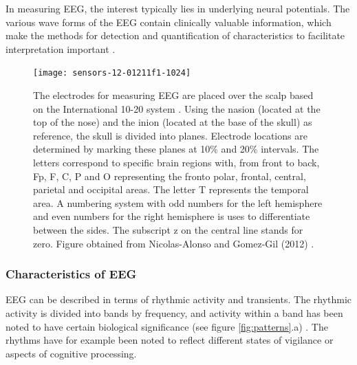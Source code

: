 \documentclass[twoside]{article}
\begin{document}
In measuring EEG, the interest typically lies in underlying neural potentials. The various wave forms of the EEG contain clinically valuable information, which make the methods for detection and quantification of characteristics to facilitate interpretation important \cite{eeg}. 

\begin{figure}
\centering

  \texttt{[image: sensors-12-01211f1-1024]}
  \caption{The electrodes for measuring EEG are placed over the scalp based on the International 10-20 system \cite{placement}. Using the nasion (located at the top of the nose) and the inion (located at the base of the skull) as reference, the skull is divided into planes. Electrode locations are determined by marking these planes at 10\% and 20\% intervals. The letters correspond to specific brain regions with, from front to back, Fp, F, C, P and O representing the fronto polar, frontal, central, parietal and occipital areas. The letter T represents the temporal area. A numbering system with odd numbers for the left hemisphere and even numbers for the right hemisphere is uses to differentiate between the sides. The subscript z on the central line stands for zero. Figure obtained from Nicolas-Alonso and Gomez-Gil (2012) \cite{BCI}.}
  

\label{fig:sensor}
\end{figure}

\subsubsection{Characteristics of EEG}
EEG can be described in terms of rhythmic activity and transients. The rhythmic activity is divided into bands by frequency, and activity within a band has been noted to have certain biological significance (see figure \ref{fig:patterns}.a) \cite{eegpatterns}. The rhythms have for example been noted to reflect different states of vigilance or aspects of cognitive processing. 
\end{document}
